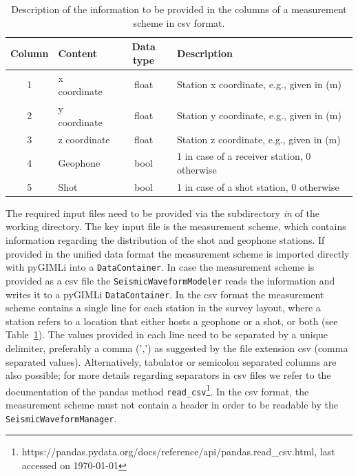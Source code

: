 \documentclass[a4paper,fleqn]{cas-sc}
\begin{document}
\begin{table}[pos=h]
    \caption{Description of the information to be provided in the columns of a measurement scheme in csv format.}
    \centering
    \begin{tabular}{clcl}
        \toprule
        Column & \textbf{Content} & \textbf{Data type} & \textbf{Description} \\
        \midrule
        1 & x coordinate & float & Station x coordinate, e.g., given in (m) \\ 
        2 & y coordinate & float & Station y coordinate, e.g., given in (m) \\ 
        3 & z coordinate & float & Station z coordinate, e.g., given in (m) \\ 
        4 & Geophone & bool & 1 in case of a receiver station, 0 otherwise \\ 
        5 & Shot & bool & 1 in case of a shot station, 0 otherwise \\
        \bottomrule
    \end{tabular}
    \label{tab:scheme}
\end{table}
The required input files need to be provided via the subdirectory \textit{in} of the working directory. The key input file is the measurement scheme, which contains information regarding the distribution of the shot and geophone stations. If provided in the unified data format the measurement scheme is imported directly with pyGIMLi into a \texttt{DataContainer}. In case the measurement scheme is provided as a csv file the \texttt{SeismicWaveformModeler} reads the information and writes it to a pyGIMLi \texttt{DataContainer}. In the csv format the measurement scheme contains a single line for each station in the survey layout, where a station refers to a location that either hosts a geophone or a shot, or both (see Table~\ref{tab:scheme}). The values provided in each line need to be separated by a unique delimiter, preferably a comma (',') as suggested by the file extension csv (comma separated values). Alternatively, tabulator or semicolon separated columns are also possible; for more details regarding separators in csv files we refer to the documentation of the pandas method \texttt{read\_csv}\footnote{https://pandas.pydata.org/docs/reference/api/pandas.read\_csv.html, last accessed on \today}. In the csv format, the measurement scheme must not contain a header in order to be readable by the \texttt{SeismicWaveformManager}.
\end{document}
